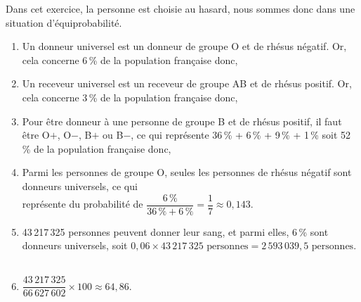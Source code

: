 Dans cet exercice, la personne est choisie au hasard, nous sommes donc dans une situation d'équiprobabilité.

\begin{enumerate}
   \item Un donneur universel est un donneur de groupe O et de rhésus négatif. Or, cela concerne 6\,\% de la population française donc, \\
   \item Un receveur universel est un receveur de groupe AB et de rhésus positif. Or, cela concerne 3\,\% de la population française donc, \\
   \item Pour être donneur à une personne de groupe B et de rhésus positif, il faut être O$+$, O$-$, B$+$ ou B$-$, ce qui représente 36\,\% + 6\,\% + 9\,\% + 1\,\% soit 52\,\% de la population française donc, \\
   \item Parmi les personnes de groupe O, seules les personnes de rhésus négatif sont donneurs universels, ce qui \\ [1mm]
   représente du probabilité de $\dfrac{6\,\%}{36\,\%+6\,\%} =\dfrac17 \approx 0,143$. \\ [2mm]
   \item 43\,217\,325 personnes peuvent donner leur sang, et parmi elles, 6\,\% sont donneurs universels, soit $0,06\times43\,217\,325\text{ personnes} =2\,593\,039,5\text{ personnes}.$ \\
    \\ [2mm]
   \item $\dfrac{43\,217\,325}{66\,627\,602}\times100 \approx64,86.$ \\ [2mm]
 \end{enumerate}
